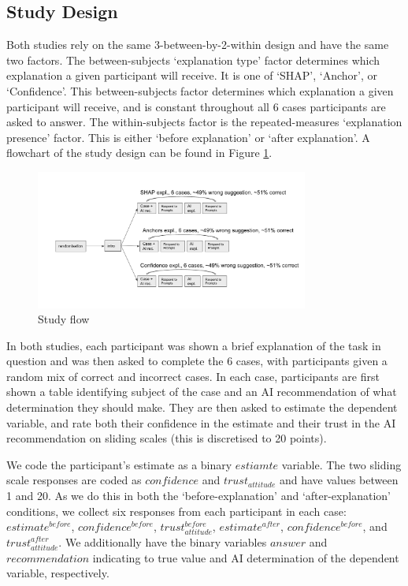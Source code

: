 \subsection{Study Design}
Both studies rely on the same 3-between-by-2-within design and have the same two factors. The between-subjects `explanation type' factor determines which explanation a given participant will receive. It is one of `SHAP', `Anchor', or `Confidence'. This between-subjects factor determines which explanation a given participant will receive, and is constant throughout all 6 cases participants are asked to answer. The within-subjects factor is the repeated-measures `explanation presence' factor. This is either `before explanation' or `after explanation'. A flowchart of the study design can be found in Figure \ref{fig:flowchart}.

\begin{figure}[htbp]
    \centering
    \includegraphics[width=0.8\textwidth]{figures/misleading_explanations/flowchart.png}
    \caption{Study flow}
    \label{fig:flowchart}
\end{figure}

In both studies, each participant was shown a brief explanation of the task in question and was then asked to complete the 6 cases, with participants given a random mix of correct and incorrect cases. In each case, participants are first shown a table identifying subject of the case and an AI recommendation of what determination they should make. They are then asked to estimate the dependent variable, and rate both their confidence in the estimate and their trust in the AI recommendation on sliding scales (this is discretised to 20 points).

We code the participant's estimate as a binary $estiamte$ variable. The two sliding scale responses are coded as $confidence$ and $trust_{attitude}$ and have values between 1 and 20. As we do this in both the `before-explanation' and `after-explanation' conditions, we collect six responses from each participant in each case:  $estimate^{before}$, $confidence^{before}$, $trust_{attitude}^{before}$, $estimate^{after}$, $confidence^{before}$, and $trust_{attitude}^{after}$.  We additionally have the binary variables $answer$ and $recommendation$ indicating to true value and AI determination of the dependent variable, respectively.

